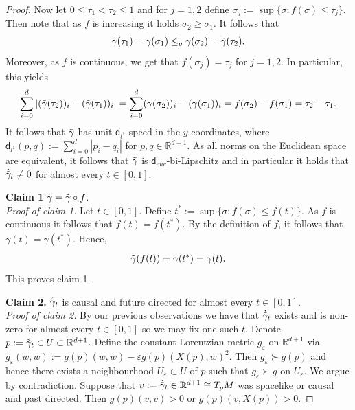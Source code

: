\documentclass[a4paper,10pt]{article}
\numberwithin{equation}{section}
\newcommand{\R}{\mathbb{R}}
\newcommand{\e}{\varepsilon}
\newcommand{\sfd}{\mathsf d}
\begin{document}
\begin{proof}
    Now let $0 \leq \tau_1 < \tau_2 \leq 1$ and for $j=1, 2$ define $\sigma_j:=\sup\{\sigma: f(\sigma) \leq \tau_j\}$. Then note that as $f$ is increasing it holds $\sigma_2 \geq \sigma_1$. It follows that 
    \begin{align}\label{tilde_gamma_causal}
        \Tilde{\gamma}(\tau_1) = \gamma(\sigma_1) \leq_g \gamma(\sigma_2) = \Tilde{\gamma}(\tau_2).
    \end{align}
    Moreover, as $f$ is continuous, we get that $f(\sigma_j)=\tau_j$ for $j=1, 2$. In particular, this yields
    \begin{align*}
        \sum_{i=0}^d|(\Tilde{\gamma}(\tau_2))_i-(\Tilde{\gamma}(\tau_1))_i| = \sum_{i=0}^d(\gamma(\sigma_2))_i-(\gamma(\sigma_1))_i = f(\sigma_2)-f(\sigma_1)=\tau_2-\tau_1. 
    \end{align*}
    It follows that $\Tilde{\gamma}$ has unit $\sfd_{l^1}$-speed in the $y$-coordinates, where $\sfd_{l^1}(p, q):= \sum_{i=0}^d |p_i-q_i|$ for $p, q \in \R^{d+1}$. As all norms on the Euclidean space are equivalent, it follows that $\Tilde{\gamma}$ is $\sfd_{euc}$-bi-Lipschitz and in particular it holds that $\dot{\Tilde{\gamma}}_t \neq 0$ for almost every $t \in [0,1]$. 

        \textbf{Claim 1} $\gamma = \Tilde{\gamma} \circ f$.\\
    \textit{Proof of claim 1.} Let $t \in [0,1]$. Define $t^*:= \sup\{\sigma: f(\sigma) \leq f(t)\}$. 
    As $f$ is continuous it follows that $f(t) = f(t^*)$. By the definition of $f$, it follows that $\gamma(t) = \gamma(t^*)$. Hence, 
    \begin{align*}
        \Tilde{\gamma}(f(t)) = \gamma(t^*) = \gamma(t).
    \end{align*}
    This proves claim 1. 

     \textbf{Claim 2.} $\dot{\Tilde{\gamma}}_t$ is causal and future directed for almost every $t \in [0,1]$. \\
    \textit{Proof of claim 2.}
    By our previous observations we have that $\dot{\Tilde{\gamma}}_t$ exists and is non-zero for almost every $t \in [0,1]$ so we may fix one such $t$.
     Denote $p:= \Tilde{\gamma}_t \in U \subset \R^{d+1}$.  Define the constant Lorentzian metric $g_\e$ on $\R^{d+1}$ via $g_\e(w,w):=g(p)(w,w)-\e g(p)(X(p), w)^2$. Then $g_\e \succ g(p)$ and hence there exists a neighbourhood $U_\e \subset U$ of $p$ such that $g_\e \succ g$ on $U_\e$.
    We argue by contradiction. 
    Suppose that $v:=\dot{\Tilde{\gamma}}_t\in \R^{d+1} \cong T_pM$ was spacelike or causal and past directed. Then $g(p)(v, v) >0$ or $g(p)(v, X(p))>0$.
     

\end{proof}
\end{document}
